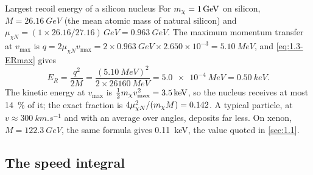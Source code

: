 \begin{workedexample}{Largest recoil energy of a silicon nucleus}\label{we:1-nuclear}
For $m_{\chi} = \SI{1}{GeV}$ on silicon, $M = \SI{26.16}{GeV}$ (the mean atomic mass of natural silicon) and $\mu_{\chi N} = (1 \times 26.16/27.16)\,\si{GeV} = \SI{0.963}{GeV}$. The maximum momentum transfer at $v_{\mathrm{max}}$ is $q = 2\mu_{\chi N}v_{\mathrm{max}} = 2 \times \SI{0.963}{GeV} \times 2.650\times10^{-3} = \SI{5.10}{MeV}$, and \cref{eq:1.3-ERmax} gives
\begin{equation*}
  E_R = \frac{q^2}{2M} = \frac{(\SI{5.10}{MeV})^2}{2 \times \SI{26160}{MeV}} = \SI{5.0e-4}{MeV} = \SI{0.50}{keV}.
\end{equation*}
The kinetic energy at $v_{\mathrm{max}}$ is $\tfrac12m_{\chi} v_{\mathrm{max}}^2 = \SI{3.5}{keV}$, so the nucleus receives at most \SI{14}{\percent} of it; the exact fraction is $4\mu_{\chi N}^2/(m_{\chi} M) = 0.142$. A typical particle, at $v \approx \SI{300}{km.s^{-1}}$ and with an average over angles, deposits far less. On xenon, $M = \SI{122.3}{GeV}$, the same formula gives \SI{0.11}{keV}, the value quoted in \cref{sec:1.1}.
\end{workedexample}

\subsection{The speed integral}\label{sec:1.3-eta}

